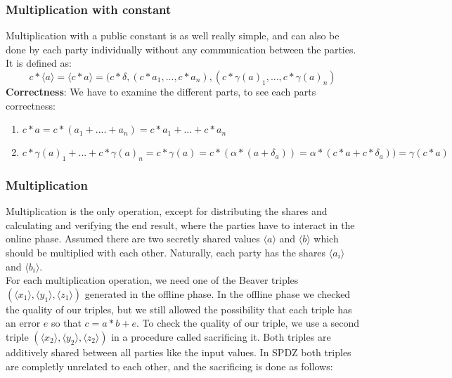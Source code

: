 \documentclass[english,runningheads,a4paper]{llncs}[2018/03/10]
\begin{document}
\subsubsection{Multiplication with constant}
Multiplication with a public constant is as well really simple, and can also be done by each party individually without any communication between the parties. It is defined as:\\
$$c*\langle a\rangle=\langle c*a\rangle=(c*\delta,(c*a_1,...,c*a_n),(c*\gamma (a)_1,...,c*\gamma (a)_n)$$
\textbf{Correctness}: We have to examine the different parts, to see each parts correctness:
\begin{enumerate}
\item \(  c*a = c * (a_1+....+a_n) = c*a_1+...+c*a_n \)
\item \( c*\gamma (a)_1+...+c*\gamma (a)_n=c*\gamma (a) = c*(\alpha*(a+\delta_a)) = \alpha*(c*a+c*\delta_a))=\gamma(c*a)\)
\end{enumerate}

\subsubsection{Multiplication}

Multiplication is the only operation, except for distributing the shares and calculating and verifying the end result, where the parties have to interact in the online phase.
Assumed there are two secretly shared values \( \langle a \rangle\) and \( \langle b \rangle\) which should be multiplied with each other. Naturally, each party has the shares \(\langle a_i\rangle \) and \(\langle b_i\rangle \).\\
For each multiplication operation, we need one of the Beaver triples \( (\langle x_1 \rangle ,\langle y_1\rangle , \langle z_1\rangle )\) generated in the offline phase. In the offline phase we checked the quality of our triples, but we still allowed the possibility that each triple has an error \(e\) so that \(c=a*b+e\). To check the quality of our triple, we use a second triple \( (\langle x_2 \rangle ,\langle y_2\rangle ,\langle z_2\rangle )\) in a procedure called sacrificing it. Both triples are additively shared between all parties like the input values. In SPDZ both triples are completly unrelated to each other, and the sacrificing is done as follows:\\
\end{document}
